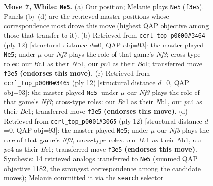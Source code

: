 \documentclass[11pt]{article}
\begin{document}
\begin{figure}[p]
\caption{\textbf{Move 7, White: \texttt{Ne5}.} (a) Our position; Melanie plays \texttt{Ne5} (\texttt{f3e5}). Panels (b)--(d) are the retrieved master positions whose correspondence most drove this move (highest QAP objective among those that transfer to it). (b) Retrieved from \texttt{ccrl\_top\_p0000\#3464} (ply 12) [structural distance $d$=0, QAP obj=93]: the master played \texttt{Ne5}; under $\mu$ our \emph{Nf3} plays the role of that game's \emph{Nf3}; cross-type roles: our \emph{B}c1 as their \emph{N}b1, our \emph{p}c4 as their \emph{B}c1; transferred move \texttt{f3e5} \textbf{(endorses this move)}. (c) Retrieved from \texttt{ccrl\_top\_p0000\#3465} (ply 12) [structural distance $d$=0, QAP obj=93]: the master played \texttt{Ne5}; under $\mu$ our \emph{Nf3} plays the role of that game's \emph{Nf3}; cross-type roles: our \emph{B}c1 as their \emph{N}b1, our \emph{p}c4 as their \emph{B}c1; transferred move \texttt{f3e5} \textbf{(endorses this move)}. (d) Retrieved from \texttt{ccrl\_top\_p0001\#3065} (ply 12) [structural distance $d$=0, QAP obj=93]: the master played \texttt{Ne5}; under $\mu$ our \emph{Nf3} plays the role of that game's \emph{Nf3}; cross-type roles: our \emph{B}c1 as their \emph{N}b1, our \emph{p}c4 as their \emph{B}c1; transferred move \texttt{f3e5} \textbf{(endorses this move)}. Synthesis: 14 retrieved analogs transferred to \texttt{Ne5} (summed QAP objective 1182, the strongest correspondence among the candidate moves); Melanie committed it via the \texttt{search} selector.}
\label{fig:thought-m12}
\end{figure}

\clearpage
\end{document}
